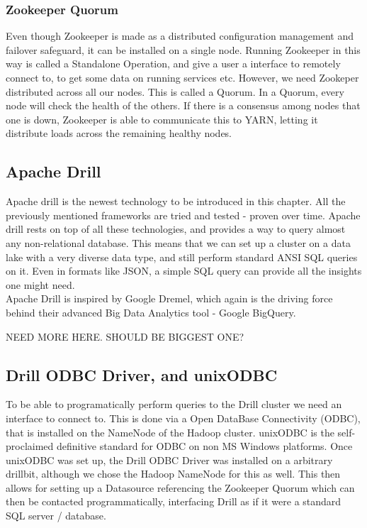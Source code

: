 \documentclass[a4paper,english]{report}
\begin{document}
				\subsubsection{Zookeeper Quorum}
				Even though Zookeeper is made as a distributed configuration management and failover safeguard, it can be installed on a single node. Running Zookeeper in this way is called a Standalone Operation, and give a user a interface to remotely connect to, to get some data on running services etc. However, we need Zookeper distributed across all our nodes. This is called a Quorum. In a Quorum, every node will check the health of the others. If there is a consensus among nodes that one is down, Zookeeper is able to communicate this to YARN, letting it distribute loads across the remaining healthy nodes. 
			
			\subsection{Apache Drill}
				Apache drill is the newest technology to be introduced in this chapter. All the previously mentioned frameworks are tried and tested - proven over time. Apache drill rests on top of all these technologies, and provides a way to query almost any non-relational database. This means that we can set up a cluster on a data lake with a very diverse data type, and still perform standard ANSI SQL queries on it. Even in formats like JSON, a simple SQL query can provide all the insights one might need.\\
				Apache Drill is inspired by Google Dremel, which again is the driving force behind their advanced Big Data Analytics tool - Google BigQuery.
				
				NEED MORE HERE. SHOULD BE BIGGEST ONE?
				
			\subsection{Drill ODBC Driver, and unixODBC}
				To be able to programatically perform queries to the Drill cluster we need an interface to connect to. This is done via a Open DataBase Connectivity (ODBC), that is installed on the NameNode of the Hadoop cluster. unixODBC is the self-proclaimed definitive standard for ODBC on non MS Windows	platforms\cite{unixodbc}. Once unixODBC was set up, the Drill ODBC Driver was installed on a arbitrary drillbit, although we chose the Hadoop NameNode for this as well. This then allows for setting up a Datasource referencing the Zookeeper Quorum which can then be contacted programmatically, interfacing Drill as if it were a standard SQL server / database.
				
\end{document}
